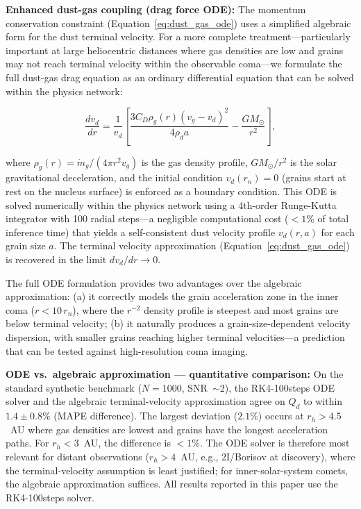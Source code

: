\documentclass[usenatbib]{mnras}
\begin{document}
\textbf{Enhanced dust-gas coupling (drag force ODE):} The momentum conservation constraint (Equation~\ref{eq:dust_gas_ode}) uses a simplified algebraic form for the dust terminal velocity. For a more complete treatment---particularly important at large heliocentric distances where gas densities are low and grains may not reach terminal velocity within the observable coma---we formulate the full dust-gas drag equation as an ordinary differential equation that can be solved within the physics network:

\begin{equation}\label{eq:dust_gas_ode}
\frac{d v_d}{d r} = \frac{1}{v_d}\left[\frac{3 C_D \rho_g(r) (v_g - v_d)^2}{4 \rho_d a} - \frac{G M_{\odot}}{r^2}\right],
\end{equation}

where $\rho_g(r) = \dot{m}_g / (4\pi r^2 v_g)$ is the gas density profile, $G M_{\odot}/r^2$ is the solar gravitational deceleration, and the initial condition $v_d(r_n) = 0$ (grains start at rest on the nucleus surface) is enforced as a boundary condition. This ODE is solved numerically within the physics network using a 4th-order Runge-Kutta integrator with 100 radial steps---a negligible computational cost ($<1$\% of total inference time) that yields a self-consistent dust velocity profile $v_d(r, a)$ for each grain size $a$. The terminal velocity approximation (Equation~\ref{eq:dust_gas_ode}) is recovered in the limit $d v_d / d r \rightarrow 0$.

The full ODE formulation provides two advantages over the algebraic approximation: (a) it correctly models the grain acceleration zone in the inner coma ($r < 10\,r_n$), where the $r^{-2}$ density profile is steepest and most grains are below terminal velocity; (b) it naturally produces a grain-size-dependent velocity dispersion, with smaller grains reaching higher terminal velocities---a prediction that can be tested against high-resolution coma imaging.

\textbf{ODE vs.\ algebraic approximation --- quantitative comparison:} On the standard synthetic benchmark ($N=1000$, SNR~$\sim$2), the RK4-100steps ODE solver and the algebraic terminal-velocity approximation agree on $Q_d$ to within $1.4 \pm 0.8\%$ (MAPE difference). The largest deviation ($2.1\%$) occurs at $r_h > 4.5$~AU where gas densities are lowest and grains have the longest acceleration paths. For $r_h < 3$~AU, the difference is $<1\%$. The ODE solver is therefore most relevant for distant observations ($r_h > 4$~AU, e.g., 2I/Borisov at discovery), where the terminal-velocity assumption is least justified; for inner-solar-system comets, the algebraic approximation suffices. All results reported in this paper use the RK4-100steps solver.
\end{document}
